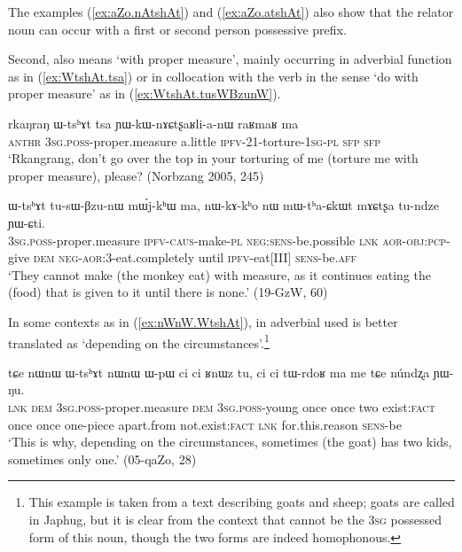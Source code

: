 The examples (\ref{ex:aZo.nAtshAt}) and (\ref{ex:aZo.atshAt}) also show that the relator noun  can occur with a first or second person possessive prefix.

Second,  also means `with proper measure', mainly occurring in adverbial function as in (\ref{ex:WtshAt.tsa}) or in collocation with the verb  in the sense `do with proper measure' as in (\ref{ex:WtshAt.tusWBzunW}). 

\begin{exe}
\ex \label{ex:WtshAt.tsa}
\gll rkaŋraŋ ɯ-tsʰɤt tsa ɲɯ-kɯ-nɤɕtʂaʁli-a-nɯ raʁmaʁ ma  \\
\textsc{anthr} \textsc{3sg}.\textsc{poss}-proper.measure a.little \textsc{ipfv}-2\fl{}1-torture-\textsc{1sg}-\textsc{pl} \textsc{sfp} \textsc{sfp}  \\
\glt `Rkangrang, don't go over the top in your torturing of me (torture me with proper measure), please? (Norbzang 2005, 245)
\end{exe}

\begin{exe}
\ex \label{ex:WtshAt.tusWBzunW}
\gll ɯ-tsʰɤt tu-sɯ-βzu-nɯ mɯ́j-kʰɯ ma, nɯ-kɤ-kʰo nɯ mɯ-tʰa-ɕkɯt mɤɕtʂa tu-ndze ɲɯ-ɕti. \\
\textsc{3sg}.\textsc{poss}-proper.measure \textsc{ipfv}-\textsc{caus}-make-\textsc{pl} \textsc{neg}:\textsc{sens}-be.possible \textsc{lnk}  \textsc{aor}-\textsc{obj}:\textsc{pcp}-give \textsc{dem} \textsc{neg}-\textsc{aor}:3\flobv{}-eat.completely until \textsc{ipfv}-eat[III] \textsc{sens}-be.\textsc{aff} \\
\glt `They cannot make (the monkey eat) with measure, as it continues eating the (food) that is given to it until there is none.' (19-GzW, 60)
\end{exe}

In some contexts as in (\ref{ex:nWnW.WtshAt}),  in adverbial used is better translated as `depending on the circumstances'.\footnote{This example is taken from a text describing goats and sheep; goats are called  in Japhug, but it is clear from the context that  cannot be the \textsc{3sg} possessed form of this noun, though the two forms are indeed homophonous. }

\begin{exe}
\ex \label{ex:nWnW.WtshAt}
\gll tɕe nɯnɯ ɯ-tsʰɤt nɯnɯ ɯ-pɯ ci ci ʁnɯz tu, ci ci tɯ-rdoʁ ma me tɕe núndʐa ɲɯ-ŋu. \\
\textsc{lnk} \textsc{dem} \textsc{3sg}.\textsc{poss}-proper.measure \textsc{dem}  \textsc{3sg}.\textsc{poss}-young once once two exist:\textsc{fact} once once one-piece apart.from not.exist:\textsc{fact} \textsc{lnk} for.this.reason \textsc{sens}-be \\
\glt `This is why, depending on the circumstances, sometimes (the goat) has two kids, sometimes only one.' (05-qaZo, 28)
\end{exe}

